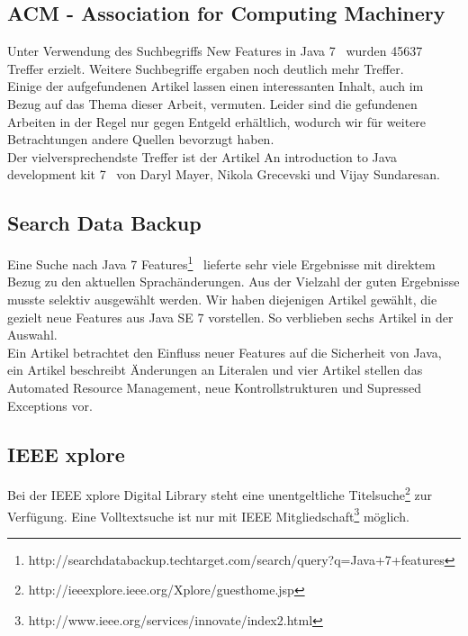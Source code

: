 \subsection*{ACM - Association for Computing Machinery}
Unter Verwendung des Suchbegriffs \glqq New Features in Java 7 \grqq ~wurden 45637 Treffer erzielt.
Weitere Suchbegriffe ergaben noch deutlich mehr Treffer.\\

Einige der aufgefundenen Artikel lassen einen interessanten Inhalt, auch im Bezug auf das Thema dieser Arbeit, vermuten. Leider sind die gefundenen Arbeiten in der Regel nur gegen Entgeld erhältlich, wodurch wir für weitere Betrachtungen andere Quellen bevorzugt haben.\\

Der vielversprechendste Treffer ist der Artikel \glqq An introduction to Java development kit 7 \grqq\cite{acmJava7} ~von Daryl Mayer, Nikola Grecevski und Vijay Sundaresan.

\subsection*{Search Data Backup}
Eine Suche nach \glqq Java 7 Features\grqq\footnote{http://searchdatabackup.techtarget.com/search/query?q=Java+7+features} ~lieferte sehr viele Ergebnisse mit direktem Bezug zu den aktuellen Sprachänderungen. Aus der Vielzahl der guten Ergebnisse musste selektiv ausgewählt werden. Wir haben diejenigen Artikel gewählt, die gezielt neue Features aus Java SE 7 vorstellen. So verblieben sechs Artikel in der Auswahl.\\

Ein Artikel\cite{sbJ7ImproveSec} betrachtet den Einfluss neuer Features auf die Sicherheit von Java, ein Artikel\cite{sbJ7literals} beschreibt Änderungen an Literalen und vier Artikel stellen das Automated Resource Management\cite{sbJ7resources}\cite{sbJ7coin}, neue Kontrollstrukturen\cite{sbJ7switch} und Supressed Exceptions\cite{sbJ7exeptions} vor.

\subsection*{IEEE xplore}
Bei der IEEE xplore Digital Library steht eine unentgeltliche Titelsuche\footnote{http://ieeexplore.ieee.org/Xplore/guesthome.jsp} zur Verfügung. Eine Volltextsuche ist nur mit IEEE Mitgliedschaft\footnote{http://www.ieee.org/services/innovate/index2.html} möglich.\\

